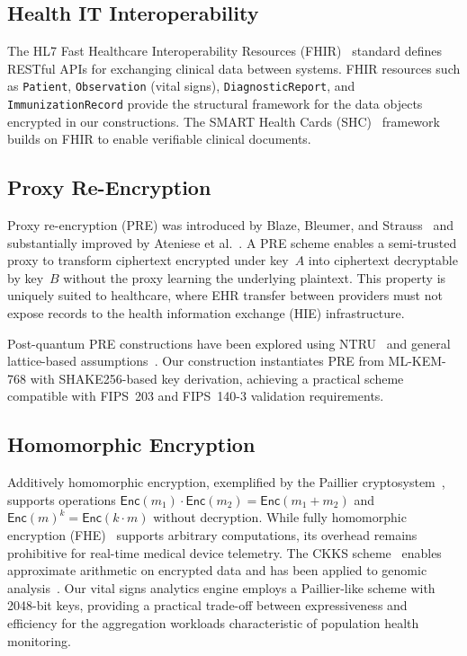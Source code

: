 \documentclass[conference,10pt]{IEEEtran}
\newcommand{\mlkem}{\textsf{ML-KEM}}
\newcommand{\shake}{\textsf{SHAKE256}}
\newcommand{\Enc}{\mathsf{Enc}}
\begin{document}
\subsection{Health IT Interoperability}

The HL7 Fast Healthcare Interoperability Resources (FHIR)~\cite{hl7fhir} standard defines RESTful APIs for exchanging clinical data between systems. FHIR resources such as \texttt{Patient}, \texttt{Observation} (vital signs), \texttt{DiagnosticReport}, and \texttt{ImmunizationRecord} provide the structural framework for the data objects encrypted in our constructions. The SMART Health Cards (SHC)~\cite{smarthealth} framework builds on FHIR to enable verifiable clinical documents.

\subsection{Proxy Re-Encryption}

Proxy re-encryption (PRE) was introduced by Blaze, Bleumer, and Strauss~\cite{blaze1998pre} and substantially improved by Ateniese et al.~\cite{ateniese2006pre}. A PRE scheme enables a semi-trusted proxy to transform ciphertext encrypted under key~$A$ into ciphertext decryptable by key~$B$ without the proxy learning the underlying plaintext. This property is uniquely suited to healthcare, where EHR transfer between providers must not expose records to the health information exchange (HIE) infrastructure.

Post-quantum PRE constructions have been explored using NTRU~\cite{nuñez2015pre} and general lattice-based assumptions~\cite{singh2020pqpre, polyakov2017pre}. Our construction instantiates PRE from \mlkem{}-768 with \shake{}-based key derivation, achieving a practical scheme compatible with FIPS~203 and FIPS~140-3 validation requirements.

\subsection{Homomorphic Encryption}

Additively homomorphic encryption, exemplified by the Paillier cryptosystem~\cite{paillier1999}, supports operations $\Enc(m_1) \cdot \Enc(m_2) = \Enc(m_1 + m_2)$ and $\Enc(m)^k = \Enc(k \cdot m)$ without decryption. While fully homomorphic encryption (FHE)~\cite{gentry2009fhe} supports arbitrary computations, its overhead remains prohibitive for real-time medical device telemetry. The CKKS scheme~\cite{cheon2017ckks} enables approximate arithmetic on encrypted data and has been applied to genomic analysis~\cite{kim2018bfv_genomics}. Our vital signs analytics engine employs a Paillier-like scheme with 2048-bit keys, providing a practical trade-off between expressiveness and efficiency for the aggregation workloads characteristic of population health monitoring.
\end{document}
